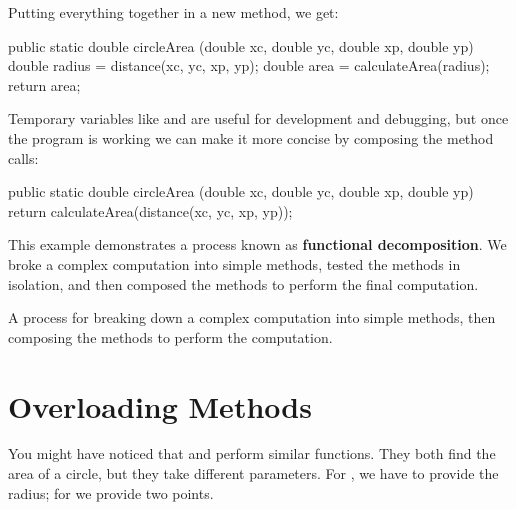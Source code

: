 Putting everything together in a new method, we get:

\begin{code}
public static double circleArea
        (double xc, double yc, double xp, double yp) {
    double radius = distance(xc, yc, xp, yp);
    double area = calculateArea(radius);
    return area;
}
\end{code}

Temporary variables like  and  are useful for development and debugging, but once the program is working we can make it more concise by composing the method calls:

\begin{code}
public static double circleArea
        (double xc, double yc, double xp, double yp) {
    return calculateArea(distance(xc, yc, xp, yp));
}
\end{code}


This example demonstrates a process known as {\bf functional decomposition}.
We broke a complex computation into simple methods, tested the methods in isolation, and then composed the methods to perform the final computation.



\begin{description}

A process for breaking down a complex computation into simple methods, then composing the methods to perform the computation.

\end{description}


\section{Overloading Methods}

You might have noticed that  and  perform similar functions.
They both find the area of a circle, but they take different parameters.
For , we have to provide the radius; for  we provide two points.

